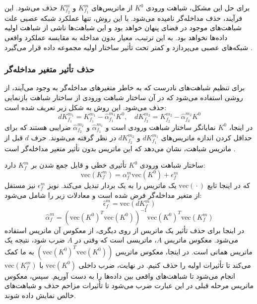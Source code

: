 برای حل این مشکل، شباهت ورودی \(K^0\) از ماتریس‌های \(K^{m}_{f_1}\) و \(K^{m}_{f_2}\) حذف می‌شود. این فرآیند، حذف مداخله‌گر%
نامیده می‌شود. با این روش، تنها عملکرد شبکه عصبی علت شباهت‌های موجود در فضای پنهان خواهد بود و این شباهت‌ها ناشی از شباهت اولیه داده‌ها نخواهد بود. به این ترتیب، معیار بدون مداخله به مقایسه عملکرد واقعی شبکه‌های عصبی می‌پردازد و کمتر تحت تأثیر ساختار اولیه مجموعه داده قرار می‌گیرد
\cite{cui2022deconfounded}.



\subsubsection{حذف تأثیر متغیر مداخله‌گر}
برای تنظیم شباهت‌های نادرست که به خاطر متغیرهای مداخله‌گر به وجود می‌آیند، از روشی استفاده می‌شود که در آن ساختار شباهت ورودی از ساختار شباهت بازنمایی حذف می‌شود. این روش به شکل زیر تعریف شده است:
\begin{equation}
 dK^{m_1}_{f_1} = K^{m_1}_{f_1} - \hat{\alpha}^{m_1}_{f_1} K^0,  \quad
dK^{m_2}_{f_2} = K^{m_2}_{f_2} - \hat{\alpha}^{m_2}_{f_2} K^0
\end{equation}
در اینجا، \(K^0\) نمایانگر ساختار شباهت ورودی است و \(\hat{\alpha}^{m_1}_{f_1}\) و \(\hat{\alpha}^{m_2}_{f_2}\) ضرایبی هستند که برای حداقل کردن اندازه‌ ماتریس‌های \(dK^{m_1}_{f_1}\) و \(dK^{m_2}_{f_2}\) در نظر گرفته می‌شوند. حرف \(d\) قبل از ماتریس شباهت، نشان می‌دهد که این ماتریس بدون تأثیر متغیر مداخله‌گر است
\cite{cui2022deconfounded}.

ساختار شباهت ورودی \(K^0\) تأثیری خطی و قابل جمع شدن بر \(K^{m}_{f}\) دارد:
\begin{equation}
	\text{vec}(K^{m}_{f}) = \alpha^{m}_{f} \text{vec}(K^0) + \epsilon^{m}_{f}
\end{equation}
که در اینجا تابع \(\text{vec}(‎\cdot)\) یک ماتریس را به یک بردار تبدیل می‌کند. نویز \(\epsilon^{m}_{f}\) نیز مستقل از متغیر مداخله‌گر فرض شده است و معادلات زیر را شامل می‌شود:
\begin{equation}
	\hat{\epsilon}^{m}_{f} = \text{vec}(dK^{m}_{f})
\end{equation}
\vspace{-34}
\begin{equation}
	\hat{\alpha}^{m}_{f} = (\text{vec}(K^0)^T \text{vec}(K^0))^{-1} \text{vec}(K^0)^T \text{vec}(K^{m}_{f})
\end{equation}
در اینجا برای حذف تأثیر یک ماتریس از روی دیگری، از معکوس آن ماتریس استفاده می‌شود. معکوس ماتریس \(A\)، ماتریسی است که وقتی در \(A\) ضرب شود، نتیجه یک ماتریس همانی%
است. در اینجا، معکوس ماتریس \((\text{vec}(K^0)^T \text{vec}(K^0))\) به ما کمک می‌کند تا تأثیرات اولیه را حذف کنیم.
در نهایت، ضرب داخلی \(\text{vec}(K^0)\) با \(\text{vec}(K^{m}_{f})\) انجام می‌شود تا شباهت‌های واقعی بین داده‌ها را به دست آوریم. سپس، معکوس ماتریس مرحله قبلی در این عبارت ضرب می‌شود تا تأثیرات مزاحم حذف و شباهت‌های خالص نمایش داده شوند.

